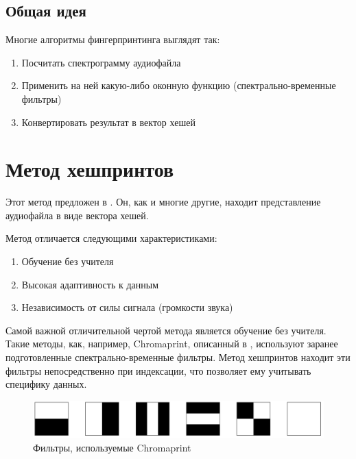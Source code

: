 \subsection{Общая идея}
Многие алгоритмы фингерпринтинга выглядят так:
\begin{enumerate}[label=\arabic*.]
        \item Посчитать спектрограмму аудиофайла
        \item Применить на ней какую-либо оконную функцию (спектрально-временные фильтры)
        \item Конвертировать результат в вектор хешей
\end{enumerate}

\section{Метод хешпринтов}
Этот метод предложен в \cite{tsai}. Он, как и многие другие, находит представление
аудиофайла в виде вектора хешей.

Метод отличается следующими характеристиками:
\begin{enumerate}[label=\arabic*.]
    \item Обучение без учителя
    \item Высокая адаптивность к данным
    \item Независимость от силы сигнала (громкости звука)
\end{enumerate}

Самой важной отличительной чертой метода является обучение без учителя.
Такие методы, как, например, Chromaprint, описанный в \cite{chromaprint}, используют
заранее подготовленные спектрально-временные фильтры.
Метод хешпринтов находит эти фильтры непосредственно при индексации, что позволяет
ему учитывать специфику данных.
\begin{figure}
    \begin{center}
        \includegraphics[scale=0.3]{inc/img/chroma.png}
        \caption{Фильтры, используемые Chromaprint}
    \end{center}
\end{figure}

